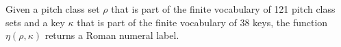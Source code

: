 
Given a pitch class set $\rho$ that is part of the finite
vocabulary of 121 pitch class sets and a key $\kappa$ that
is part of the finite vocabulary of 38 keys, the function
$\eta(\rho, \kappa)$ returns a Roman numeral label.

